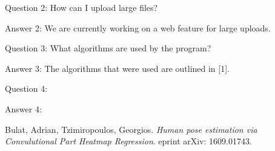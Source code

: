 \documentclass{scrreprt}
\begin{document}
Question 2: How can I upload large files?

Answer 2: We are currently working on a web feature for large uploads.

Question 3: What algorithms are used by the program?

Answer 3: The algorithms that were used are outlined in [1].

Question 4:

Answer 4:

\begin{thebibliography}{9}

Bulat, Adrian, Tzimiropoulos, Georgios. 
\textit{Human pose estimation via Convulutional Part Heatmap Regression}. 
eprint arXiv: 1609.01743.

\end{thebibliography}
\end{document}
